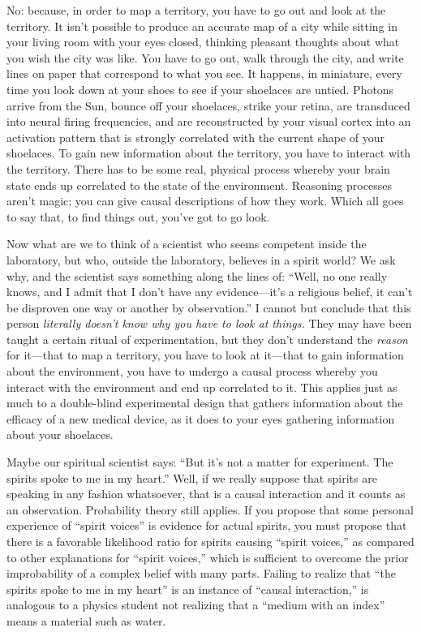 {
 No: because, in order to map a territory, you have to go out and
look at the territory. It isn't possible to produce an
accurate map of a city while sitting in your living room with your eyes
closed, thinking pleasant thoughts about what you wish the city was
like. You have to go out, walk through the city, and write lines on
paper that correspond to what you see. It happens, in miniature, every
time you look down at your shoes to see if your shoelaces are untied.
Photons arrive from the Sun, bounce off your shoelaces, strike your
retina, are transduced into neural firing frequencies, and are
reconstructed by your visual cortex into an activation pattern that is
strongly correlated with the current shape of your shoelaces. To gain
new information about the territory, you have to interact with the
territory. There has to be some real, physical process whereby your
brain state ends up correlated to the state of the environment.
Reasoning processes aren't magic; you can give causal
descriptions of how they work. Which all goes to say that, to find
things out, you've got to go look.}

{
 Now what are we to think of a scientist who seems competent inside
the laboratory, but who, outside the laboratory, believes in a spirit
world? We ask why, and the scientist says something along the lines of:
``Well, no one really knows, and I admit that I
don't have any evidence---it's a
religious belief, it can't be disproven one way or
another by observation.'' I cannot but conclude that
this person \textit{literally doesn't know why you have
to look at things.} They may have been taught a certain ritual of
experimentation, but they don't understand the
\textit{reason} for it---that to map a territory, you have to look at
it---that to gain information about the environment, you have to
undergo a causal process whereby you interact with the environment and
end up correlated to it. This applies just as much to a double-blind
experimental design that gathers information about the efficacy of a
new medical device, as it does to your eyes gathering information about
your shoelaces.}

{
 Maybe our spiritual scientist says: ``But
it's not a matter for experiment. The spirits spoke to
me in my heart.'' Well, if we really suppose that
spirits are speaking in any fashion whatsoever, that is a causal
interaction and it counts as an observation. Probability theory still
applies. If you propose that some personal experience of
``spirit voices'' is evidence for
actual spirits, you must propose that there is a favorable likelihood
ratio for spirits causing ``spirit
voices,'' as compared to other explanations for
``spirit voices,'' which is
sufficient to overcome the prior improbability of a complex belief with
many parts. Failing to realize that ``the spirits
spoke to me in my heart'' is an instance of
``causal interaction,'' is analogous
to a physics student not realizing that a ``medium
with an index'' means a material such as water.}

